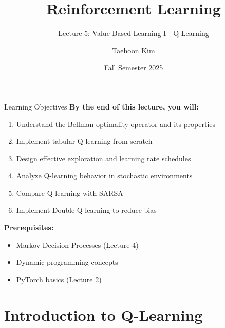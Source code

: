 \documentclass[aspectratio=169,10pt]{beamer}
\title{Reinforcement Learning}
\subtitle{Lecture 5: Value-Based Learning I - Q-Learning}
\author{Taehoon Kim}
\institute{Sogang University MIMIC Lab \\ \url{https://mimic-lab.com}}
\date{Fall Semester 2025}
\begin{document}
\frame{\titlepage}


\begin{frame}{Learning Objectives}
\textbf{By the end of this lecture, you will:}
\begin{enumerate}
    \item Understand the Bellman optimality operator and its properties
    \item Implement tabular Q-learning from scratch
    \item Design effective exploration and learning rate schedules
    \item Analyze Q-learning behavior in stochastic environments
    \item Compare Q-learning with SARSA
    \item Implement Double Q-learning to reduce bias
\end{enumerate}

\vspace{1em}
\textbf{Prerequisites:}
\begin{itemize}
    \item Markov Decision Processes (Lecture 4)
    \item Dynamic programming concepts
    \item PyTorch basics (Lecture 2)
\end{itemize}
\end{frame}

\section{Introduction to Q-Learning}
\end{document}
